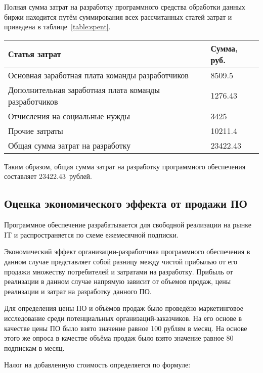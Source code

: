 Полная сумма затрат на разработку программного средства обработки данных биржи находится путём суммирования всех рассчитанных статей затрат и приведена в таблице~\ref{table:spent}.

\begin{small}
\begin{tabularx}{\textwidth}{|X|p{}|}
    \caption{Затраты на разработку программного обеспечения}\label{table:spent}\\
    \hline
    Статья затрат & Сумма, руб. \\
    \hline
    Основная заработная плата команды разработчиков & 8509.5 \\
    \hline
    Дополнительная заработная плата команды разработчиков & 1276.43 \\
    \hline
    Отчисления на социальные нужды & 3425 \\
    \hline
    Прочие затраты & 10211.4 \\
    \hline
    Общая сумма затрат на разработку & 23422.43 \\
    \hline
\end{tabularx}
\end{small}

Таким образом, общая сумма затрат на разработку программного обеспечения составляет 23422.43~рублей.

\subsection{Оценка экономического эффекта от продажи ПО}

Программное обеспечение разрабатывается для свободной реализации на рынке IT и распространяется по схеме ежемесячной подписки.

Экономический эффект организации-разработчика программного обеспечения в данном случае представляет собой разницу между чистой прибылью от его продажи множеству потребителей и затратами на разработку. Прибыль от реализации в данном случае напрямую зависит от объемов продаж, цены реализации и затрат на разработку данного ПО. 

Для определения цены ПО и объёмов продаж было проведёно маркетинговое исследование среди потенциальных организаций-заказчиков. На его основе в качестве цены ПО было взято значение равное 100 рублям в месяц. На основе этого же опроса в качестве объёма продаж было взято значение равное 80 подпискам в месяц.

Налог на добавленную стоимость определяется по формуле:

